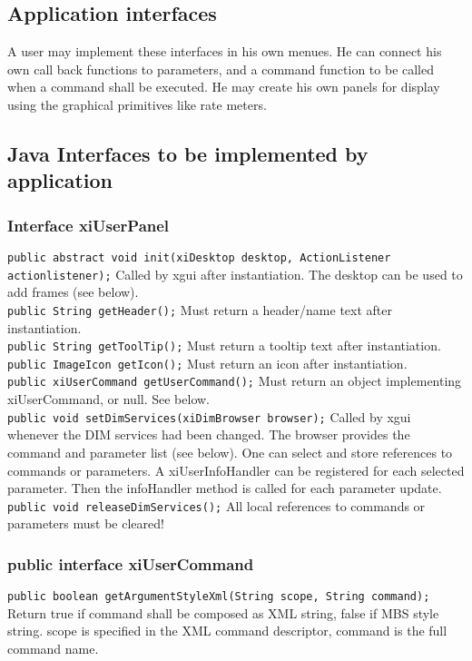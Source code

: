 \subsection{Application interfaces}
A user may implement these interfaces in his own menues. He can connect his own call back functions to parameters, and a command function to be called when a command shall be executed. He may create his own panels for display using the graphical primitives like rate meters.

\subsection{Java Interfaces to be implemented by application}
\subsubsection{Interface xiUserPanel}
{\tt public abstract void init(xiDesktop desktop, ActionListener actionlistener);}
Called by xgui after instantiation. The desktop can be used to add frames (see below).\\
{\tt public String getHeader();}
Must return a header/name text after instantiation.\\
{\tt public String getToolTip();}
Must return a tooltip text after instantiation.\\
{\tt public ImageIcon getIcon();}
Must return an icon after instantiation.\\
{\tt public xiUserCommand getUserCommand();}
Must return an object implementing xiUserCommand, or null. See below.\\
{\tt public void setDimServices(xiDimBrowser browser);}
Called by xgui whenever the DIM services had been changed.
The browser provides the command and parameter list (see below). One can select and store references to commands or parameters. A xiUserInfoHandler can be registered for each selected parameter. Then the infoHandler method is called for each parameter update.\\
{\tt public void releaseDimServices();}
All local references to commands or parameters must be cleared!

\subsubsection{public interface xiUserCommand}
{\tt public boolean getArgumentStyleXml(String scope, String command);}
Return true if command shall be composed as XML string, false if MBS style string. scope is specified in the XML command descriptor, command is the full command name.

